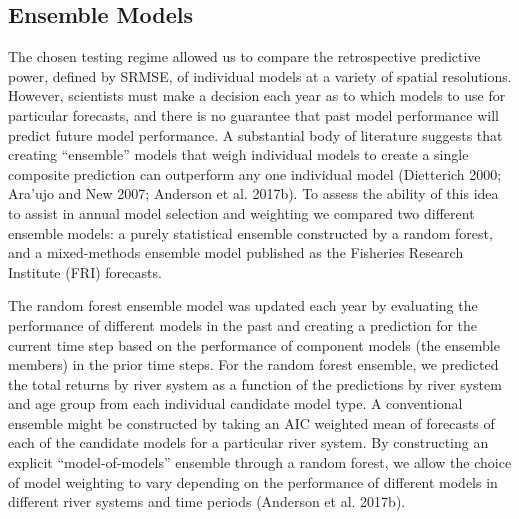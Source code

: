 \documentclass[
]{article}
\begin{document}
\hypertarget{ensemble-models}{%
\subsection*{Ensemble Models}\label{ensemble-models}}

The chosen testing regime allowed us to compare the retrospective predictive power, defined by SRMSE, of individual models at a variety of spatial resolutions. However, scientists must make a decision each year as to which models to use for particular forecasts, and there is no guarantee that past model performance will predict future model performance. A substantial body of literature suggests that creating ``ensemble'' models that weigh individual models to create a single composite prediction can outperform any one individual model (Dietterich 2000; Ara'ujo and New 2007; Anderson et al. 2017b). To assess the ability of this idea to assist in annual model selection and weighting we compared two different ensemble models: a purely statistical ensemble constructed by a random forest, and a mixed-methods ensemble model published as the Fisheries Research Institute (FRI) forecasts.

The random forest ensemble model was updated each year by evaluating the performance of different models in the past and creating a prediction for the current time step based on the performance of component models (the ensemble members) in the prior time steps. For the random forest ensemble, we predicted the total returns by river system as a function of the predictions by river system and age group from each individual candidate model type. A conventional ensemble might be constructed by taking an AIC weighted mean of forecasts of each of the candidate models for a particular river system. By constructing an explicit ``model-of-models'' ensemble through a random forest, we allow the choice of model weighting to vary depending on the performance of different models in different river systems and time periods (Anderson et al. 2017b).
\end{document}
